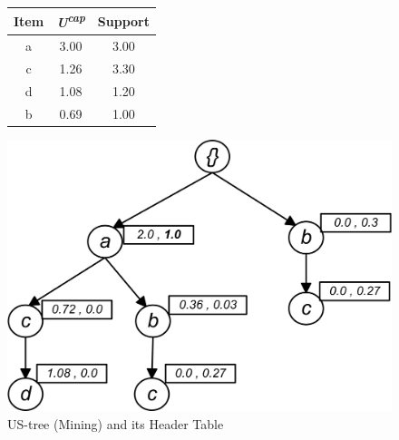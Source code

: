 \begin{figure}
\begin{minipage}{0.40\textwidth}
  \centering
  
	\begin{center}
	\begin{tabular}{ |c|c|c| } 
 	\hline
 		Item&\emph{U\textsuperscript{cap}}&Support\\ \hline\hline
 		a &  3.00  & 3.00\\ \hline
 		c &  1.26  & 3.30\\ \hline
 		d &  1.08  & 1.20\\ \hline
 		b &  0.69  & 1.00\\ \hline
\end{tabular}
\end{center}  
  
  
\end{minipage}
\hfill
\begin{minipage}{0.40\textwidth}
  \centering
  \includegraphics[width=\textwidth]{images/M_TREE.jpg}
\end{minipage}
\caption{US-tree (Mining) and its Header Table}
\label{figure:min_ready}
\end{figure}
%
